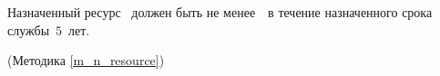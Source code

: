 Назначенный ресурс \dut \ должен быть не менее~\tnresource \ в течение назначенного срока службы~$5$~лет.

\begin{flushright}
	(Методика \ref{m_n_resource})
\end{flushright}
